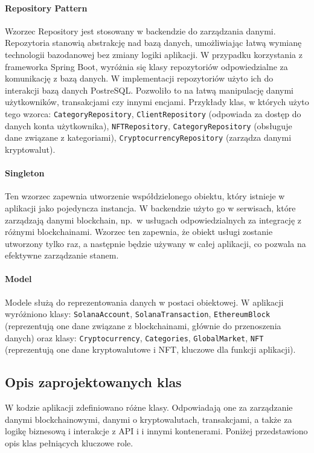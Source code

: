 \paragraph{Repository Pattern}
Wzorzec Repository jest stosowany w backendzie do zarządzania danymi. Repozytoria stanowią abstrakcję nad bazą danych, umożliwiając łatwą wymianę technologii bazodanowej bez zmiany logiki aplikacji. W przypadku korzystania z frameworka Spring Boot, wyróżnia się klasy repozytoriów odpowiedzialne za komunikację z bazą danych. W implementacji repozytoriów użyto ich do interakcji bazą danych PostreSQL. Pozwoliło to  na łatwą manipulację danymi użytkowników, transakcjami czy innymi encjami. Przykłady klas, w których użyto tego wzorca: \texttt{CategoryRepository}, \texttt{ClientRepository} (odpowiada za dostęp do danych konta użytkownika), \texttt{NFTRepository},   \texttt{CategoryRepository} (obsługuje dane związane z kategoriami), \texttt{CryptocurrencyRepository} (zarządza danymi kryptowalut).

\paragraph{Singleton}
Ten wzorzec zapewnia utworzenie współdzielonego obiektu, który istnieje w aplikacji jako pojedyncza instancja. W backendzie użyto go w serwisach, które zarządzają danymi blockchain, np.\ w usługach odpowiedzialnych za integrację z różnymi blockchainami. Wzorzec ten zapewnia, że obiekt usługi zostanie utworzony tylko raz, a następnie będzie używany w całej aplikacji, co pozwala na efektywne zarządzanie stanem.

\paragraph{Model}
Modele służą do reprezentowania danych w postaci obiektowej. W aplikacji wyróżniono klasy: \texttt{SolanaAccount}, \texttt{SolanaTransaction}, \texttt{EthereumBlock} (reprezentują one dane związane z blockchainami, głównie do przenoszenia danych) oraz klasy: \texttt{Cryptocurrency}, \texttt{Categories}, \texttt{GlobalMarket}, \texttt{NFT}
(reprezentują one dane kryptowalutowe i NFT, kluczowe dla funkcji aplikacji).


\subsection{Opis zaprojektowanych klas}
W kodzie aplikacji zdefiniowano różne klasy. Odpowiadają one za zarządzanie danymi blockchainowymi, danymi o kryptowalutach, transakcjami, a także za logikę biznesową i interakcje z API i i innymi kontenerami. Poniżej przedstawiono opis klas pełniących kluczowe role.

